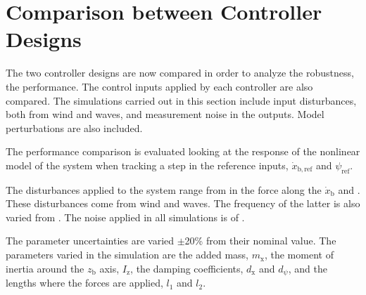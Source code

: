 \section{Comparison between Controller Designs}\label{sec:comparison}
The two controller designs are now compared in order to analyze the robustness, the performance. The control inputs applied by each controller are also compared. The simulations carried out in this section include input disturbances, both from wind and waves, and measurement noise in the outputs. Model perturbations are also included.

The performance comparison is evaluated looking at the response of the nonlinear model of the system when tracking a step in the reference inputs, $\dot{x}_\mathrm{b,ref}$ and $\psi_\mathrm{ref}$. 

The disturbances applied to the system range from  in the force along the $\dot{x}_\mathrm{b}$ and . These disturbances come from wind and waves. The frequency of the latter is also varied from . The noise applied in all simulations is of . 

The parameter uncertainties are varied $\pm$20\%  from their nominal value. The parameters varied in the simulation are the added mass, $m_\mathrm{x}$, the moment of inertia around the $z_\mathrm{b}$ axis, $I_\mathrm{z}$, the damping coefficients, $d_\mathrm{x}$ and $d_\psi$, and the lengths where the forces are applied, $l_1$ and $l_2$. 

